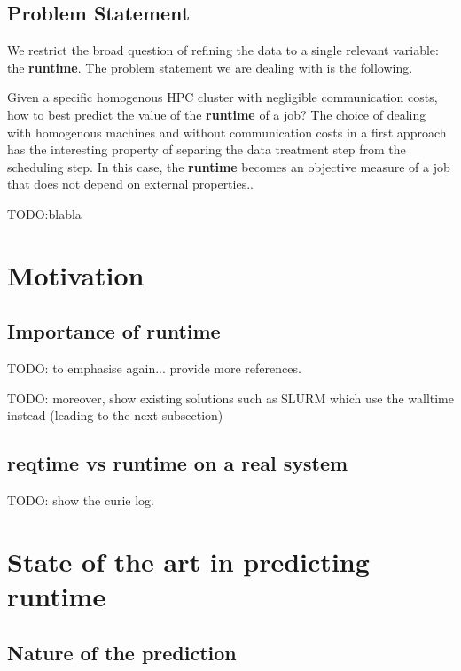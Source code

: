 \documentclass{article}
\begin{document}
\subsection{Problem Statement}
We restrict the broad question of refining the data to a single relevant variable: the \textbf{runtime}. The problem statement we are dealing with is the following.

Given a specific homogenous HPC cluster with negligible communication costs, how to best predict the value of the \textbf{runtime} of a job?
The choice of dealing with homogenous machines and without communication costs in a first approach has the interesting property of separing the data treatment step from the scheduling step. In this case, the \textbf{runtime} becomes an objective measure of a job that does not depend on external properties..

TODO:blabla

\section{Motivation}

\subsection{Importance of \textbf{runtime}}
\label{sub:importance_of_runtime}
TODO: to emphasise again... provide more references.

TODO: moreover, show existing solutions such as SLURM which use the walltime instead (leading to the next subsection)


\subsection{\textbf{reqtime} vs \textbf{runtime} on a real system}
\label{sub:reqtime_vs_runtime_on_a_real_system}

TODO: show the curie log.



\section{State of the art in predicting \textbf{runtime}}


\subsection{Nature of the prediction}
\label{sub:nature_of_the_prediction}
\end{document}
